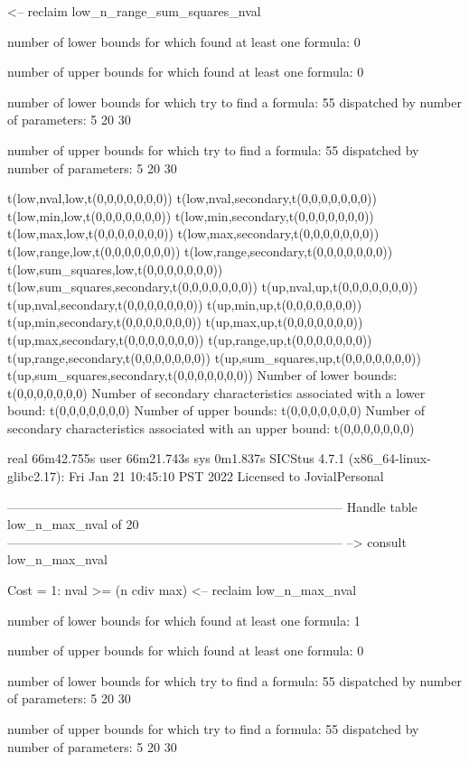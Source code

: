 <-- reclaim low_n_range_sum_squares_nval

number of lower bounds for which found at least one formula: 0

number of upper bounds for which found at least one formula: 0

number of lower bounds for which try to find a formula: 55
dispatched by number of parameters: 5  20  30

number of upper bounds for which try to find a formula: 55
dispatched by number of parameters: 5  20  30

t(low,nval,low,t(0,0,0,0,0,0,0))
t(low,nval,secondary,t(0,0,0,0,0,0,0))
t(low,min,low,t(0,0,0,0,0,0,0))
t(low,min,secondary,t(0,0,0,0,0,0,0))
t(low,max,low,t(0,0,0,0,0,0,0))
t(low,max,secondary,t(0,0,0,0,0,0,0))
t(low,range,low,t(0,0,0,0,0,0,0))
t(low,range,secondary,t(0,0,0,0,0,0,0))
t(low,sum_squares,low,t(0,0,0,0,0,0,0))
t(low,sum_squares,secondary,t(0,0,0,0,0,0,0))
t(up,nval,up,t(0,0,0,0,0,0,0))
t(up,nval,secondary,t(0,0,0,0,0,0,0))
t(up,min,up,t(0,0,0,0,0,0,0))
t(up,min,secondary,t(0,0,0,0,0,0,0))
t(up,max,up,t(0,0,0,0,0,0,0))
t(up,max,secondary,t(0,0,0,0,0,0,0))
t(up,range,up,t(0,0,0,0,0,0,0))
t(up,range,secondary,t(0,0,0,0,0,0,0))
t(up,sum_squares,up,t(0,0,0,0,0,0,0))
t(up,sum_squares,secondary,t(0,0,0,0,0,0,0))
Number of lower bounds:                                             t(0,0,0,0,0,0,0)
Number of secondary characteristics associated with a lower bound:  t(0,0,0,0,0,0,0)
Number of upper bounds:                                             t(0,0,0,0,0,0,0)
Number of secondary characteristics associated with an upper bound: t(0,0,0,0,0,0,0)

real	66m42.755s
user	66m21.743s
sys	0m1.837s
SICStus 4.7.1 (x86_64-linux-glibc2.17): Fri Jan 21 10:45:10 PST 2022
Licensed to JovialPersonal


--------------------------------------------------------------------------------
Handle table low_n_max_nval of 20
--------------------------------------------------------------------------------
--> consult low_n_max_nval

Cost =  1:  nval >= (n cdiv max)
<-- reclaim low_n_max_nval

number of lower bounds for which found at least one formula: 1

number of upper bounds for which found at least one formula: 0

number of lower bounds for which try to find a formula: 55
dispatched by number of parameters: 5  20  30

number of upper bounds for which try to find a formula: 55
dispatched by number of parameters: 5  20  30

